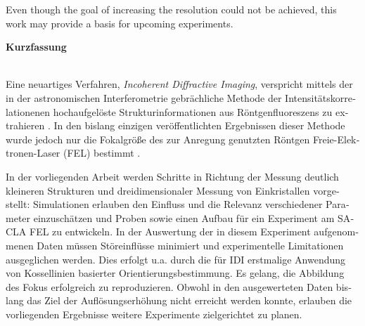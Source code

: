 Even though the goal of increasing the resolution could not be achieved, this work may provide a basis for upcoming experiments.





\clearpage
 
 \begin{otherlanguage}{german}
 \begin{Huge}
 	\textbf{Kurzfassung}\vspace{12mm}
 \end{Huge}
\\
Eine neuartiges Verfahren, \textit{Incoherent Diffractive Imaging}, verspricht mittels der in der  astronomischen Interferometrie gebrächliche Methode der Intensitätskorrelationenen  hochaufgelöste Strukturinformationen aus Röntgenfluoreszens zu extrahieren \cite{classen2017}.  
In den bislang einzigen veröffentlichten Ergebnissen dieser Methode wurde jedoch nur  die Fokalgröße des zur Anregung genutzten Röntgen Freie-Elektronen-Laser (FEL) bestimmt \cite{nakumura2020}.

In der vorliegenden Arbeit werden Schritte in Richtung der Messung deutlich kleineren Strukturen und dreidimensionaler Messung von Einkristallen vorgestellt: Simulationen erlauben den Einfluss und die Relevanz verschiedener Parameter einzuschätzen und Proben sowie einen Aufbau für ein Experiment am SACLA FEL zu entwickeln. In der Auswertung der in diesem Experiment aufgenommenen Daten müssen Störeinflüsse minimiert und experimentelle Limitationen ausgeglichen werden. Dies erfolgt u.a. durch die für IDI erstmalige Anwendung von Kossellinien basierter Orientierungsbestimmung. 
Es gelang, die Abbildung des Fokus erfolgreich zu reproduzieren.  Obwohl in den ausgewerteten Daten bislang das Ziel der Auflösungserhöhung nicht erreicht werden konnte, erlauben die vorliegenden Ergebnisse weitere Experimente zielgerichtet zu planen.
\end{otherlanguage}
